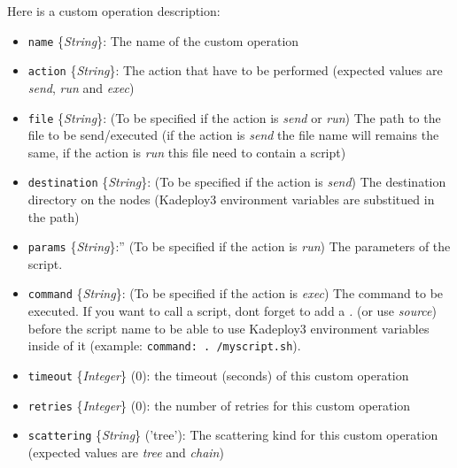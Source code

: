 \documentclass[a4wide,10pt,oneside]{book}
\newcommand{\yfield}[2]{\texttt{#1} {\small\{{\emph{#2}}\}}:}
\newcommand{\yfieldd}[3]{\texttt{#1} {\small\{{\emph{#2}}\}} {\small(}#3{\small)}:}
\begin{document}
Here is a custom operation description:
\begin{itemize}
  \item \yfield{name}{String} The name of the custom operation
  \item \yfield{action}{String} The action that have to be performed (expected values are \emph{send}, \emph{run} and \emph{exec})
  \item \yfield{file}{String} \small{(To be specified if the action is \emph{send} or \emph{run})} The path to the file to be send/executed (if the action is \emph{send} the file name will remains the same, if the action is \emph{run} this file need to contain a script)
  \item \yfield{destination}{String} \small{(To be specified if the action is \emph{send})} The destination directory on the nodes (Kadeploy3 environment variables are substitued in the path)
  \item \yfield{params}{String}{''} \small{(To be specified if the action is \emph{run})} The parameters of the script.
  \item \yfield{command}{String} \small{(To be specified if the action is \emph{exec})} The command to be executed. If you want to call a script, dont forget to add a \emph{.} (or use \emph{source}) before the script name to be able to use Kadeploy3 environment variables inside of it (example: \texttt{command: . /myscript.sh}).
  \item \yfieldd{timeout}{Integer}{0} the timeout (seconds) of this custom operation
  \item \yfieldd{retries}{Integer}{0} the number of retries for this custom operation
  \item \yfieldd{scattering}{String}{'tree'} The scattering kind for this custom operation (expected values are \emph{tree} and \emph{chain})
\end{itemize} 
\end{document}
